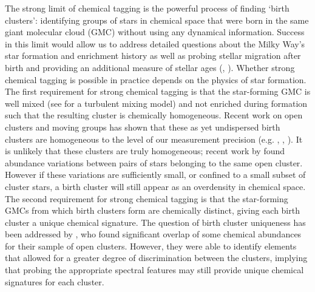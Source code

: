 \documentclass[a4paper,fleqn,usenatbib]{mnras}
\begin{document}


The strong limit of chemical tagging is the powerful process of finding `birth clusters': identifying groups of stars in chemical space that were born in the same giant molecular cloud (GMC) without using any dynamical information. Success in this limit would allow us to address detailed questions about the Milky Way's star formation and enrichment history as well as probing stellar migration after birth and providing an additional measure of stellar ages (\citealt{Bland-Hawthorn2010}, \citealt{Mitschang2014}). Whether strong chemical tagging is possible in practice depends on the physics of star formation. The first requirement for strong chemical tagging is that the star-forming GMC is well mixed (see \citet{Feng2014} for a turbulent mixing model) and not enriched during formation such that the resulting cluster is chemically homogeneous. Recent work on open clusters and moving groups has shown that these as yet undispersed birth clusters are homogeneous to the level of our measurement precision (e.g. \citealt{DeSilva2006}, \citealt{DeSilva2007}, \citealt{Bovy2016}). It is unlikely that these clusters are truly homogeneous; recent work by \citet{Liu2016} found abundance variations between pairs of stars belonging to the same open cluster. However if these variations are sufficiently small, or confined to a small subset of cluster stars, a birth cluster will still appear as an overdensity in chemical space. The second requirement for strong chemical tagging is that the star-forming GMCs from which birth clusters form are chemically distinct, giving each birth cluster a unique chemical signature. The question of birth cluster uniqueness has been addressed by \citet{Blanco-Cuaresma2015}, who found significant overlap of some chemical abundances for their sample of open clusters. However, they were able to identify elements that allowed for a greater degree of discrimination between the clusters, implying that probing the appropriate spectral features may still provide unique chemical signatures for each cluster.
\end{document}
